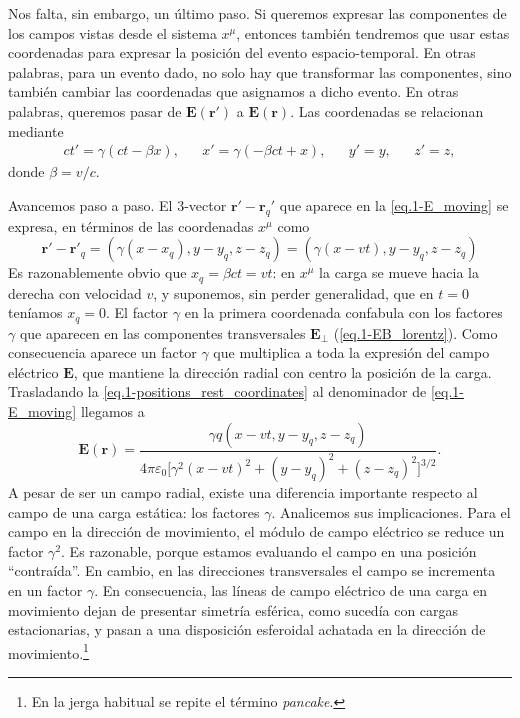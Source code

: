 \begin{example}
    Nos falta, sin embargo, un último paso. Si queremos expresar las componentes de los campos vistas desde el sistema \(x^\mu\), entonces también tendremos que usar estas coordenadas para expresar la posición del evento espacio-temporal. En otras palabras, para un evento dado, no solo hay que transformar las componentes, sino también cambiar las coordenadas que asignamos a dicho evento. En otras palabras, queremos pasar de \(\mathbf{E}(\mathbf{r}')\) a \(\mathbf{E}(\mathbf{r})\). Las coordenadas se relacionan mediante
    \begin{align}
        ct' = \gamma(ct - \beta x), && x' = \gamma(-\beta ct + x), && y' = y, && z' = z,
    \end{align}
    donde \(\beta=v/c\). 
    
    Avancemos paso a paso. El 3-vector \(\mathbf{r}' - \mathbf{r}_q'\) que aparece en la \cref{eq.1-E_moving} se expresa, en términos de las coordenadas \(x^\mu\) como 
    \begin{equation}
        \label{eq.1-positions_rest_coordinates}
        \mathbf{r}' - \mathbf{r}'_q = \left(\gamma(x-x_q), y-y_q, z-z_q\right) = \left(\gamma(x-vt), y-y_q, z-z_q\right)
    \end{equation}
    Es razonablemente obvio que \(x_q = \beta ct = vt\): en \(x^{\mu}\) la carga se mueve hacia la derecha con velocidad \(v\), y suponemos, sin perder generalidad, que en \(t=0\) teníamos \(x_q = 0\). El factor \(\gamma\) en la primera coordenada confabula con los factores \(\gamma\) que aparecen en las componentes transversales \(\mathbf{E}_\perp\) (\cref{eq.1-EB_lorentz}). Como consecuencia aparece un factor \(\gamma\) que multiplica a toda la expresión del campo eléctrico \(\mathbf{E}\), que mantiene la dirección radial con centro la posición de la carga. Trasladando la \cref{eq.1-positions_rest_coordinates} al denominador de \cref{eq.1-E_moving} llegamos a
    \begin{equation*}
        \mathbf{E}(\mathbf{r}) = \frac{\gamma q \left(x-vt, y-y_q, z-z_q\right)}{4\pi\varepsilon_0\Big[\gamma^2(x-vt)^2 + (y-y_q)^2 + (z-z_q)^2\Big]^{3/2}}.
    \end{equation*}
    A pesar de ser un campo radial, existe una diferencia importante respecto al campo de una carga estática: los factores \(\gamma\). Analicemos sus implicaciones. Para el campo en la dirección de movimiento, el módulo de campo eléctrico se reduce un factor \(\gamma^2\). Es razonable, porque estamos evaluando el campo en una posición ``contraída''. En cambio, en las direcciones transversales el campo se incrementa en un factor \(\gamma\). En consecuencia, las líneas de campo eléctrico de una carga en movimiento dejan de presentar simetría esférica, como sucedía con cargas estacionarias, y pasan a una disposición esferoidal achatada en la dirección de movimiento.\footnote{En la jerga habitual se repite el término \textit{pancake}.}


\end{example}
